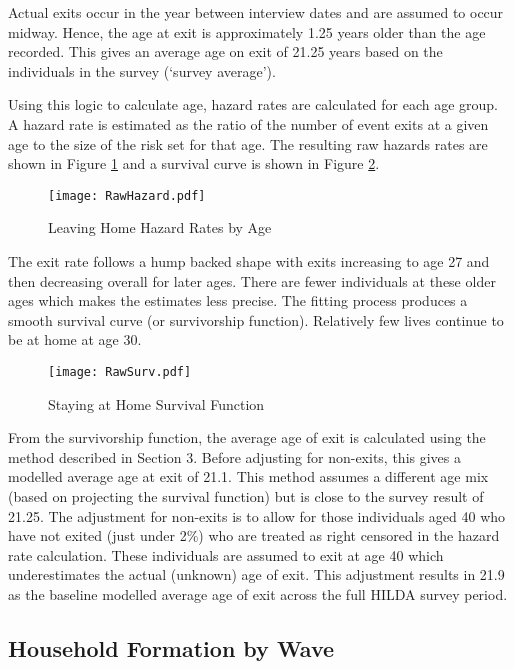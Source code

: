 \documentclass[12pt]{article}
\begin{document}
Actual exits occur in the year between interview dates and are assumed to occur midway. Hence, the age at exit is approximately 1.25 years older than the age recorded. This gives an average age on exit of 21.25 years based on the individuals in the survey (`survey average').

Using this logic to calculate age, hazard rates are calculated for each age group. A hazard rate is estimated as the ratio of the number of event exits at a given age to the size of the risk set for that age. The resulting raw hazards rates are shown in Figure \ref{ExitbyAge} and a survival curve is shown in Figure \ref{StaybyAge}.

\begin{figure}[htpb]
  \caption{Leaving Home Hazard Rates by Age}
  \label{ExitbyAge}
  \centering
  \texttt{[image: RawHazard.pdf]}
\end{figure}

The exit rate follows a hump backed shape with exits increasing to age 27 and then decreasing overall for later ages. There are fewer individuals at these older ages which makes the estimates less precise. The fitting process produces a smooth survival curve (or survivorship function). Relatively few lives continue to be at home at age 30.

\begin{figure}[htpb]
  \caption{Staying at Home Survival Function}
  \label{StaybyAge}
  \centering
  \texttt{[image: RawSurv.pdf]}
\end{figure}

From the survivorship function, the average age of exit is calculated using the method described in Section 3. Before adjusting for non-exits, this gives a modelled average age at exit of 21.1. This method assumes a different age mix (based on projecting the survival function) but is close to the survey result of 21.25. The adjustment for non-exits is to allow for those individuals aged 40 who have not exited (just under 2\%) who are treated as right censored in the hazard rate calculation. These individuals are assumed to exit at age 40 which underestimates the actual (unknown) age of exit. This adjustment results in 21.9 as the baseline modelled average age of exit across the full HILDA survey period.

\subsection{Household Formation by Wave}
\end{document}
